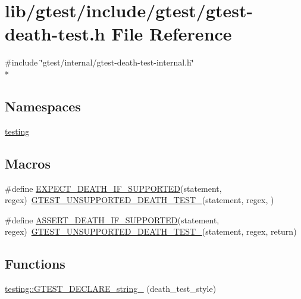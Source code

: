 \hypertarget{gtest-death-test_8h}{\section{lib/gtest/include/gtest/gtest-\/death-\/test.h File Reference}
\label{gtest-death-test_8h}
}
{\ttfamily \#include \char`\"{}gtest/internal/gtest-\/death-\/test-\/internal.\-h\char`\"{}}\\*
\subsection*{Namespaces}
\begin{DoxyCompactItemize}
\item 
\hyperlink{namespacetesting}{testing}
\end{DoxyCompactItemize}
\subsection*{Macros}
\begin{DoxyCompactItemize}
\item 
\#define \hyperlink{gtest-death-test_8h_a8564de0e012dd0898949c513d1571f8b}{E\-X\-P\-E\-C\-T\-\_\-\-D\-E\-A\-T\-H\-\_\-\-I\-F\-\_\-\-S\-U\-P\-P\-O\-R\-T\-E\-D}(statement, regex)~\hyperlink{gtest-death-test-internal_8h_a29a145cda8bd2d0c6a78b0ac1d670d18}{G\-T\-E\-S\-T\-\_\-\-U\-N\-S\-U\-P\-P\-O\-R\-T\-E\-D\-\_\-\-D\-E\-A\-T\-H\-\_\-\-T\-E\-S\-T\-\_\-}(statement, regex, )
\item 
\#define \hyperlink{gtest-death-test_8h_ab2f0f25b46353767179a49ebd15b7345}{A\-S\-S\-E\-R\-T\-\_\-\-D\-E\-A\-T\-H\-\_\-\-I\-F\-\_\-\-S\-U\-P\-P\-O\-R\-T\-E\-D}(statement, regex)~\hyperlink{gtest-death-test-internal_8h_a29a145cda8bd2d0c6a78b0ac1d670d18}{G\-T\-E\-S\-T\-\_\-\-U\-N\-S\-U\-P\-P\-O\-R\-T\-E\-D\-\_\-\-D\-E\-A\-T\-H\-\_\-\-T\-E\-S\-T\-\_\-}(statement, regex, return)
\end{DoxyCompactItemize}
\subsection*{Functions}
\begin{DoxyCompactItemize}
\item 
\hyperlink{namespacetesting_a37b7e87f0a5f502c6918f37d1768c1f3}{testing\-::\-G\-T\-E\-S\-T\-\_\-\-D\-E\-C\-L\-A\-R\-E\-\_\-string\-\_\-} (death\-\_\-test\-\_\-style)
\end{DoxyCompactItemize}


